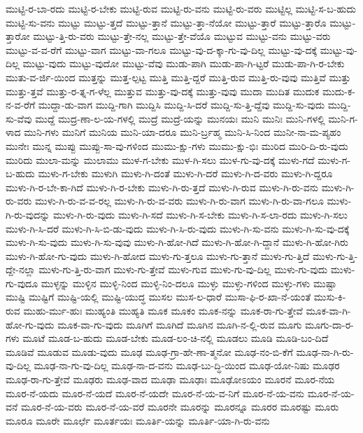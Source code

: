 {ಮುಟ್ಟಿ-ರ-ಬಾ-ರದು
ಮುಟ್ಟಿ-ರ-ಬೇಕು
ಮುಟ್ಟಿ-ರುವ
ಮುಟ್ಟಿ-ರು-ವನು
ಮುಟ್ಟಿ-ರು-ವರು
ಮುಟ್ಟಿಲ್ಲ
ಮುಟ್ಟಿ-ಸ-ಬ-ಹುದು
ಮುಟ್ಟಿ-ಸು-ವನು
ಮುಟ್ಟು
ಮುಟ್ಟು-ತ್ತದೆ
ಮುಟ್ಟು-ತ್ತಾನೆ
ಮುಟ್ಟು-ತ್ತಾ-ನೆಯೋ
ಮುಟ್ಟು-ತ್ತಾರೆ
ಮುಟ್ಟು-ತ್ತಾರೊ
ಮುಟ್ಟು-ತ್ತಾರೋ
ಮುಟ್ಟು-ತ್ತಿ-ರು-ವರು
ಮುಟ್ಟು-ತ್ತೇ-ನಲ್ಲ
ಮುಟ್ಟು-ತ್ತೇ-ವೆಯೊ
ಮುಟ್ಟುವ
ಮುಟ್ಟು-ವನು
ಮುಟ್ಟು-ವರು
ಮುಟ್ಟು-ವ-ವ-ರೆಗೆ
ಮುಟ್ಟು-ವಾಗ
ಮುಟ್ಟು-ವಾ-ಗಲೂ
ಮುಟ್ಟು-ವು-ದ-ಕ್ಕಾ-ಗು-ವು-ದಿಲ್ಲ
ಮುಟ್ಟು-ವು-ದಕ್ಕೆ
ಮುಟ್ಟು-ವು-ದಿಲ್ಲ
ಮುಟ್ಟು-ವುದು
ಮುಟ್ಟು-ವುದೋ
ಮುಟ್ಟು-ವೆವು
ಮುಡು-ಪಾಗಿ
ಮುಡು-ಪಾ-ಗಿ-ಟ್ಟರೆ
ಮುಡು-ಪಾ-ಗಿ-ರ-ಬೇಕು
ಮುತು-ವ-ರ್ಜಿ-ಯಿಂದ
ಮುತ್ತನ್ನು
ಮುತ್ತ-ಲ್ಪಟ್ಟ
ಮುತ್ತಿ
ಮುತ್ತಿ-ದ್ದರೆ
ಮುತ್ತಿ-ರುವ
ಮುತ್ತಿ-ರು-ವುವು
ಮುತ್ತಿವೆ
ಮುತ್ತು
ಮುತ್ತು-ತ್ತವೆ
ಮುತ್ತು-ರ-ತ್ನ-ಗ-ಳೆಲ್ಲ
ಮುತ್ತುವ
ಮುತ್ತು-ವು-ದಕ್ಕೆ
ಮುತ್ತು-ವುವು
ಮುದಾ
ಮುದಿತ
ಮುದುಕ
ಮುದು-ಕ-ನ-ವ-ರೆಗೆ
ಮುದ್ದಾ-ಡು-ವಾಗ
ಮುದ್ದಿ-ಗಾಗಿ
ಮುದ್ದಿಸಿ
ಮುದ್ದಿ-ಸಿ-ದರೆ
ಮುದ್ದಿ-ಸು-ತ್ತಿ-ದ್ದೆವು
ಮುದ್ದಿ-ಸು-ವುದು
ಮುದ್ದಿ-ಸು-ವೆವು
ಮುದ್ದೆ
ಮುದ್ರ-ಣಾ-ಲ-ಯ-ಗಳಲ್ಲಿ
ಮುದ್ರೆ
ಮುದ್ರೆ-ಯನ್ನು
ಮುನಯಃ
ಮುನಿ
ಮುನಿಃ
ಮುನಿ-ಗಳಲ್ಲಿ
ಮುನಿ-ಗ-ಳಾದ
ಮುನಿ-ಗಳು
ಮುನಿಗೆ
ಮುನಿಯ
ಮುನಿ-ಯಾ-ದರೂ
ಮುನಿ-ರ್ಬ್ರಹ್ಮ
ಮುನಿ-ಸಿ-ನಿಂದ
ಮುನೀ-ನಾ-ಮ-ಪ್ಯಹಂ
ಮುನೇಃ
ಮುನ್ನ
ಮುಪ್ಪು
ಮುಪ್ಪು-ಸಾ-ವು-ಗಳಿಂದ
ಮುಮು-ಕ್ಷು-ಗಳು
ಮುಮು-ಕ್ಷು-ಭಿಃ
ಮುರಿದ
ಮುರಿ-ದಿ-ರು-ವುದು
ಮುರಿದು
ಮುಲಾ-ಮನ್ನು
ಮುಲಾಮು
ಮುಳ-ಗ-ಬೇಕು
ಮುಳ-ಗಿ-ಸಲು
ಮುಳ-ಗು-ವು-ದಕ್ಕೆ
ಮುಳು-ಗದೆ
ಮುಳು-ಗ-ಬ-ಹುದು
ಮುಳು-ಗ-ಬೇಕು
ಮುಳುಗಿ
ಮುಳು-ಗಿ-ದಂತೆ
ಮುಳು-ಗಿ-ದರೆ
ಮುಳು-ಗಿ-ದ-ವರು
ಮುಳು-ಗಿ-ದ್ದರೂ
ಮುಳು-ಗಿ-ರ-ಬೇ-ಕಾ-ಗಿದೆ
ಮುಳು-ಗಿ-ರ-ಬೇಕು
ಮುಳು-ಗಿ-ರು-ತ್ತದೆ
ಮುಳು-ಗಿ-ರುವ
ಮುಳು-ಗಿ-ರು-ವನು
ಮುಳು-ಗಿ-ರು-ವರು
ಮುಳು-ಗಿ-ರು-ವ-ವ-ರಲ್ಲ
ಮುಳು-ಗಿ-ರು-ವ-ವರು
ಮುಳು-ಗಿ-ರು-ವಾಗ
ಮುಳು-ಗಿ-ರು-ವಾ-ಗಲೂ
ಮುಳು-ಗಿ-ರು-ವುದನ್ನು
ಮುಳು-ಗಿ-ರು-ವುದು
ಮುಳು-ಗಿ-ಸದೆ
ಮುಳು-ಗಿ-ಸ-ಬೇಕು
ಮುಳು-ಗಿ-ಸ-ಲಾ-ರದು
ಮುಳು-ಗಿ-ಸಲು
ಮುಳು-ಗಿ-ಸಿ-ದರೆ
ಮುಳು-ಗಿ-ಸಿ-ಬಿ-ಡು-ವುದು
ಮುಳು-ಗಿ-ಸಿ-ರು-ವುದು
ಮುಳು-ಗಿ-ಸು-ವನು
ಮುಳು-ಗಿ-ಸು-ವು-ದಕ್ಕೆ
ಮುಳು-ಗಿ-ಸು-ವುದು
ಮುಳು-ಗಿ-ಸು-ವುವು
ಮುಳು-ಗಿ-ಹೋ-ಗಿದೆ
ಮುಳು-ಗಿ-ಹೋ-ಗಿ-ದ್ದಾನೆ
ಮುಳು-ಗಿ-ಹೋ-ಗಿರು
ಮುಳು-ಗಿ-ಹೋ-ಗು-ವುದು
ಮುಳು-ಗಿ-ಹೋದ
ಮುಳು-ಗು-ತ್ತಲೂ
ಮುಳು-ಗು-ತ್ತಾನೆ
ಮುಳು-ಗು-ತ್ತಿದೆ
ಮುಳು-ಗು-ತ್ತಿ-ದ್ದೇ-ನಲ್ಲಾ
ಮುಳು-ಗು-ತ್ತಿ-ರು-ವಾಗ
ಮುಳು-ಗು-ತ್ತೇವೆ
ಮುಳು-ಗುವ
ಮುಳು-ಗು-ವು-ದಿಲ್ಲ
ಮುಳು-ಗು-ವುದು
ಮುಳು-ಗು-ವುದೂ
ಮುಳ್ಳನ್ನು
ಮುಳ್ಳಿನ
ಮುಳ್ಳಿ-ನಿಂದ
ಮುಳ್ಳಿ-ನಿಂ-ದಲೂ
ಮುಳ್ಳು
ಮುಳ್ಳು-ಗಳಿಂದ
ಮುಳ್ಳು-ಗಳು
ಮುಷ್ಟಾ
ಮುಷ್ಟಿ
ಮುಷ್ಟಿಗೆ
ಮುಷ್ಟಿ-ಯಲ್ಲಿ
ಮುಷ್ಟಿ-ಯುದ್ಧ
ಮುಸಲ
ಮುಸ-ಲ-ಧಾರೆ
ಮುಸಾ-ಫಿ-ರ-ಖಾ-ನೆ-ಯಂತೆ
ಮುಸು-ಕಿ-ರುವ
ಮುಹು-ರ್ಮು-ಹುಃ
ಮುಹ್ಯಂತಿ
ಮುಹ್ಯತಿ
ಮೂಕ
ಮೂಕಂ
ಮೂಕ-ನನ್ನು
ಮೂಕ-ರಾ-ಗು-ತ್ತೇವೆ
ಮೂಕ-ವಾ-ಗಿ-ಹೋ-ಗು-ವುದು
ಮೂಕ-ವಾ-ಗು-ವುದು
ಮೂಗಿಗೆ
ಮೂಗಿದೆ
ಮೂಗಿನ
ಮೂಗಿ-ನ-ಲ್ಲಿ-ರುವ
ಮೂಗು
ಮೂಗು-ದಾ-ರ-ಗಳು
ಮೂಟೆ
ಮೂಡ-ಬ-ಹುದು
ಮೂಡ-ಬೇಕು
ಮೂಡ-ಲಂ-ಚಿ-ನಲ್ಲಿ
ಮೂಡಲು
ಮೂಡಿ
ಮೂಡಿ-ಬಂ-ದಿದೆ
ಮೂಡಿವೆ
ಮೂಡುವ
ಮೂಡು-ವುದು
ಮೂಢ
ಮೂಢ-ಗ್ರಾ-ಹೇ-ಣಾ-ತ್ಮನೋ
ಮೂಢ-ನಂ-ಬಿ-ಕೆಗೆ
ಮೂಢ-ನಾ-ಗಿ-ರು-ವು-ದಿಲ್ಲ
ಮೂಢ-ನಾ-ಗು-ವು-ದಿಲ್ಲ
ಮೂಢ-ನಾ-ದ-ವನು
ಮೂಢ-ಬು-ದ್ಧಿ-ಯಿಂದ
ಮೂಢ-ಯೋ-ನಿಷು
ಮೂಢರ
ಮೂಢ-ರಾ-ಗು-ತ್ತೇವೆ
ಮೂಢರು
ಮೂಢ-ವಾದ
ಮೂಢಾ
ಮೂಢಾಃ
ಮೂಢೋಽಯಂ
ಮೂರನೆ
ಮೂರ-ನೆಯ
ಮೂರ-ನೆ-ಯದು
ಮೂರ-ನೆ-ಯದೆ
ಮೂರ-ನೆ-ಯದೇ
ಮೂರ-ನೆ-ಯ-ವ-ನಿಗೆ
ಮೂರ-ನೆ-ಯ-ವನು
ಮೂರ-ನೆ-ಯ-ವನೆ
ಮೂರ-ನೆ-ಯ-ವರು
ಮೂರ-ನೆ-ಯ-ವರೆ
ಮೂರನೇ
ಮೂರನ್ನು
ಮೂರನ್ನೂ
ಮೂರರ
ಮೂರಷ್ಟು
ಮೂರು
ಮೂರೂ
ಮೂರೇ
ಮೂರ್ಛೆ
ಮೂರ್ತಯಃ
ಮೂರ್ತಿ-ಯನ್ನು
ಮೂರ್ತಿ-ಯಾ-ಗಿ-ರು-ವನು
}
